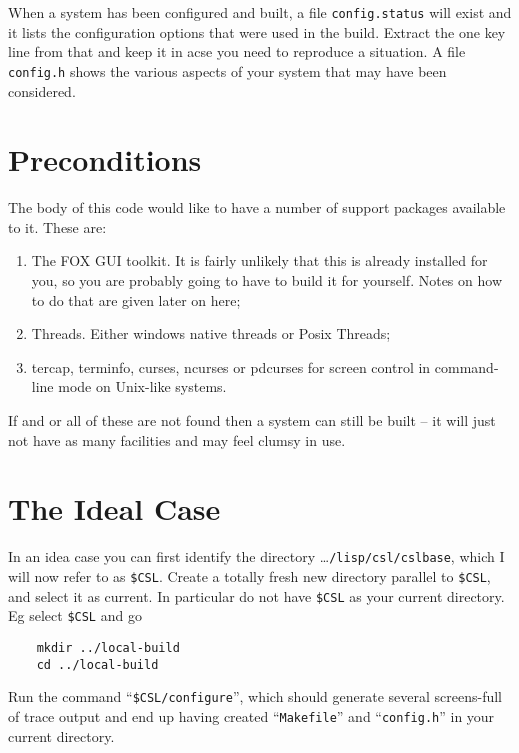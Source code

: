 \documentclass[11pt]{article}
\begin{document}
When a system has been configured and built, a file \verb+config.status+ will
exist and it lists the configuration options that were used in the build.
Extract the one key line from that and keep it in acse you need to
reproduce a situation. A file \verb+config.h+ shows the various aspects of
your system that may have been considered.

\section{Preconditions}
The body of this code would like to have a number of support packages
available to it. These are:
\begin{enumerate}
\item The FOX GUI toolkit. It is fairly unlikely that this is
already installed for you, so you are probably going to have to build
it for yourself. Notes on how to do that are given later on here;
\item Threads. Either windows native threads or Posix Threads;
\item tercap, terminfo, curses, ncurses or pdcurses for screen control
in command-line mode on Unix-like systems.
\end{enumerate}

If and or all of these are not found then a system can still be built --
it will just not have as many facilities and may feel clumsy in use.

\section{The Ideal Case}
In an idea case you can first identify the directory
\ldots\verb+/lisp/csl/cslbase+,
which I will now refer to as \verb+$CSL+. Create a totally fresh new directory
parallel to \verb.$CSL., and select it as current. In particular do not
have \verb+$CSL+ as your current directory. Eg select \verb.$CSL. and go
\begin{verbatim}
    mkdir ../local-build
    cd ../local-build
\end{verbatim}

Run the command
``\verb+$CSL/configure+'', which should generate several screens-full
of trace output and end up having created ``\verb+Makefile+'' and
``\verb+config.h+'' in your current directory.
\end{document}
